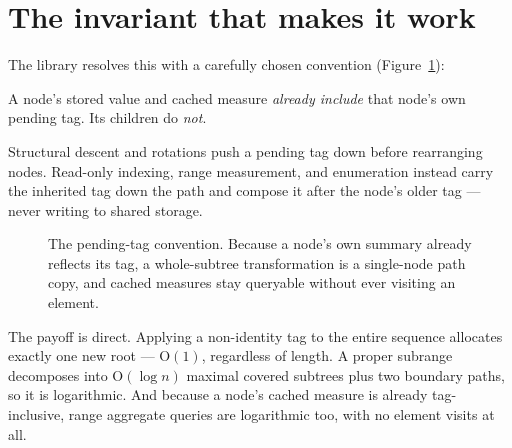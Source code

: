 \documentclass[11pt,twoside,openright]{book}
\newcommand{\bigoh}[1]{$\mathrm{O}(#1)$}
\begin{document}
\section{The invariant that makes it work}

The library resolves this with a carefully chosen convention
(Figure~\ref{fig:rangetag}):

\begin{contractbox}
A node's stored value and cached measure \emph{already include} that node's own
pending tag. Its children do \emph{not}.

Structural descent and rotations push a pending tag down before rearranging
nodes. Read-only indexing, range measurement, and enumeration instead carry the
inherited tag down the path and compose it after the node's older tag --- never
writing to shared storage.
\end{contractbox}

\begin{figure}[htbp]
\centering
{}
\caption{The pending-tag convention. Because a node's own summary already
reflects its tag, a whole-subtree transformation is a single-node path copy, and
cached measures stay queryable without ever visiting an element.}
\label{fig:rangetag}
\end{figure}

The payoff is direct. Applying a non-identity tag to the entire sequence
allocates exactly one new root --- \bigoh{1}, regardless of length. A proper
subrange decomposes into \bigoh{\log n} maximal covered subtrees plus two
boundary paths, so it is logarithmic. And because a node's cached measure is
already tag-inclusive, range aggregate queries are logarithmic too, with no
element visits at all.
\end{document}
